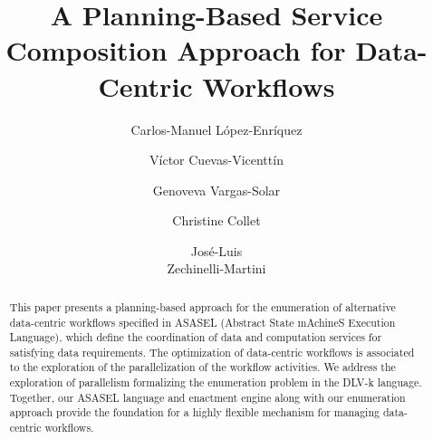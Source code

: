 \documentclass{llncs}
\begin{document}

\title{A Planning-Based Service Composition Approach for Data-Centric Workflows}
%
%
\author{
Carlos-Manuel L\'opez-Enr\'iquez \and V\'ictor Cuevas-Vicentt\'in \and Genoveva Vargas-Solar
\and Christine Collet \and Jos\'e-Luis \\Zechinelli-Martini
}
%
%
%


\maketitle              %

\begin{abstract}

This paper presents a planning-based approach for the enumeration of alternative data-centric workflows specified in ASASEL (Abstract State mAchineS Execution Language), which define the coordination of data and computation services for satisfying data requirements.
The optimization of data-centric workflows is associated to the exploration of the parallelization of the workflow activities.
We address the exploration of parallelism formalizing the enumeration problem in the DLV-k language. 
Together, our ASASEL language and enactment engine along with our enumeration approach provide the foundation for a highly flexible mechanism for managing data-centric workflows.

\end{abstract}
%
\end{document}
